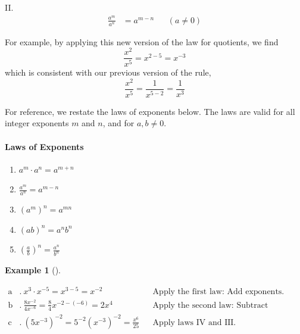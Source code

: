 \documentclass[10pt,]{book}
\theoremstyle{plain}
\theoremstyle{definition}
\theoremstyle{definition}
\theoremstyle{definition}
\newtheorem{example}[theorem]{Example}
\theoremstyle{definition}
\theoremstyle{definition}
\numberwithin{equation}{section}
\newcommand{\amp}{ & }
\begin{document}
II. \begin{align*}\frac{a^m}{a^n}\amp= a^{m−n}\amp\amp (a \ne 0)\end{align*}
%
\par
%
\par

    For example, by applying this new version of the law for quotients, we find 
    \begin{equation*}\frac{x^2}{x^5}= x^{2−5} = x^{−3}\end{equation*}
    which is consistent with our previous version of the rule,
    \begin{equation*}\frac{x^2}{x^5}= \frac{1}{x^{5−2}}= \frac{1}{x^3}\end{equation*}
%
\par

    For reference, we restate the laws of exponents below. The laws are valid for all integer exponents \(m\) and \(n\), and for \(a, b \ne 0\).
%
\typeout{************************************************}
\typeout{************************************************}
\paragraph[Laws of Exponents]{Laws of Exponents}\label{paragraphs-45}
\index{}\leavevmode%
\begin{enumerate}[label=*\Roman**]
\item\hypertarget{li-453}{}\(a^m\cdot a^n = a^{m+n}\)\item\hypertarget{li-454}{}\(\frac{a^m}{a^n}=a^{m-n}\)\item\hypertarget{li-455}{}\(\left(a^m\right)^n=a^{mn}\)\item\hypertarget{li-456}{}\(\left(ab\right)^n=a^n b^n\)\item\hypertarget{li-457}{}\(\left(\frac{a}{b}\right)^n=\frac{a^n}{b^n}\)\end{enumerate}
\begin{example}[]\label{example-laws-of-exponents}

\begin{align*}
    \text{a}\amp. ~x^3\cdot x^{−5} = x^{3−5} = x^{−2} 
    \amp\amp     \text{Apply the first law: Add exponents.} \\
    \text{b}\amp. ~\frac{8x^{−2}}{4x^{-6}}= \frac{8}{4}x^{−2−(−6)} = 2x^4
    \amp\amp     \text{Apply the second law: Subtract exponents.} \\
    \text{c}\amp. ~\left(5x^{−3}\right)^{−2}= 5^{−2}(x^{−3})^{−2}=\frac{x^6}{25}
    \amp\amp     \text{Apply laws IV and III.}
\end{align*}
%
\end{example}
\par
\end{document}
